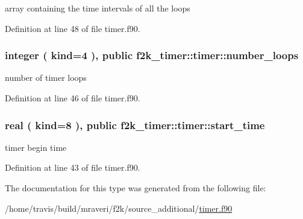 array containing the time intervals of all the loops 



Definition at line 48 of file timer.\+f90.

\subsubsection[{\texorpdfstring{number\+\_\+loops}{number_loops}}]{\setlength{\rightskip}{0pt plus 5cm}integer ( kind=4 ), public f2k\+\_\+timer\+::timer\+::number\+\_\+loops}\hypertarget{structf2k__timer_1_1timer_af06ab0260ee7e89251d9746c11bcec3e}{}\label{structf2k__timer_1_1timer_af06ab0260ee7e89251d9746c11bcec3e}


number of timer loops 



Definition at line 46 of file timer.\+f90.

\subsubsection[{\texorpdfstring{start\+\_\+time}{start_time}}]{\setlength{\rightskip}{0pt plus 5cm}real ( kind=8 ), public f2k\+\_\+timer\+::timer\+::start\+\_\+time}\hypertarget{structf2k__timer_1_1timer_ab0fc31e03517687fcb0bfdd357f332ab}{}\label{structf2k__timer_1_1timer_ab0fc31e03517687fcb0bfdd357f332ab}


timer begin time 



Definition at line 43 of file timer.\+f90.



The documentation for this type was generated from the following file\+:\begin{DoxyCompactItemize}
\item 
/home/travis/build/mraveri/f2k/source\+\_\+additional/\hyperlink{timer_8f90}{timer.\+f90}\end{DoxyCompactItemize}
